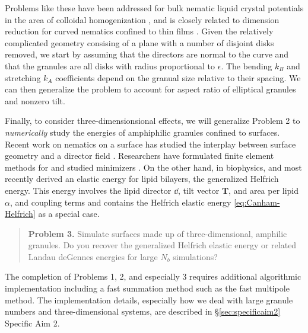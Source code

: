 Problems like these have been addressed for bulk nematic liquid
crystal potentials in the area of colloidal homogenization
\cite{Canevari2019DesignOE,doi:10.1137/18M1163919,doi:10.1137/18M1163919,
  BERLYAND200597,doi:10.1137/130910348},
and is closely related to 
dimension reduction for curved nematics confined to thin films
\cite{Golovaty2017DimensionRF, Golovaty2015DimensionRF,
doi:10.1142/S0218202516500470, FoFrLe07}.
Given the relatively complicated geometry consising
of a plane with a number of disjoint disks removed, 
we start by assuming that the directors are normal to the curve
and that the granules are all disks with radius proportional to $\epsilon$. 
The bending $k_B$ and stretching $k_A$ coefficients
depend on the granual size relative to their spacing.
We can then generalize the problem to account for aspect ratio of
elliptical granules and nonzero tilt. 



Finally, to consider three-dimensionsional effects, we
will generalize Problem 2 to \emph{numerically}
study the energies of amphiphilic granules confined to surfaces.
Recent work on nematics on a surface has studied
the interplay between 
surface geometry and a director field
\cite{Nestler2020PropertiesOS, Nitschke2018NematicLC,
  Nestler2018OrientationalOO, Nitschke2019HydrodynamicII,
  Nitschke2020LiquidCO}.
Researchers have formulated finite element methods for
\cite{Bartels2012FiniteEM, Nochetto2015NumericsFL,
  Nestler2019AFE}
  and studied minimizers
\cite{Segatti2014EquilibriumCO,Segatti2014AnalysisOA}.
On the other hand, in biophysics,
\cite{Hamm2000ElasticEO,Terzi2019CurvatureTiltTO,Terzi2019ACQ,Terzi2017NovelTC}
and most recently \cite{Pinigin2020NewCT}
derived an elastic energy for lipid bilayers,
the generalized Helfrich energy.
This energy involves the lipid director $\dd$,
tilt vector $\mathbf{T}$, and area per lipid $\alpha$,
and coupling terms and contains
the Helfrich elastic energy \eqref{eq:Canham-Helfrich}
as a special case.
\begin{quotation}
\textbf{Problem 3.}
Simulate surfaces made up of three-dimensional, amphilic granules.
Do you recover the generalized Helfrich elastic energy
or related Landau deGennes energies for large $N_b$ simulations?
\end{quotation}

The completion of Problems 1, 2, and especially 3 
requires additional algorithmic implementation including a
fast summation method such as the fast multipole method.
The implementation details, especially how we deal with large
granule numbers and three-dimensional systems, are
described in \S \ref{sec:specificaim2} Specific Aim 2.

